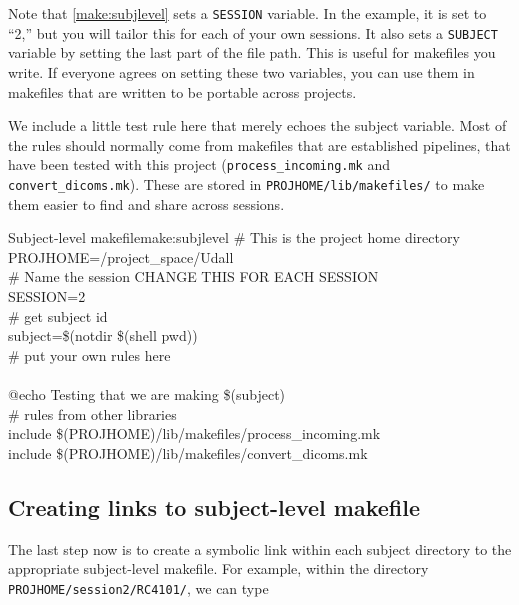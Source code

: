 Note that \autoref{make:subjlevel} sets a \texttt{SESSION} variable. In the example, it is set to ``2,'' but you will tailor this for each of your own sessions. It also sets a \texttt{SUBJECT} variable by setting the last part of the file path. This is useful for makefiles you write. If everyone agrees on setting these two variables, you can use them in makefiles that are written to be portable across projects.

We include a little test rule here that merely echoes the subject variable. Most of the rules should normally come from makefiles that are established pipelines, that have been tested with this project (\texttt{process_incoming.mk} and \texttt{convert_dicoms.mk}). These are stored in \texttt{PROJHOME/lib/makefiles/} to make them easier to find and share across sessions.

\begin{make}{Subject-level makefile}{make:subjlevel}
	\# This is the project home directory \\	
	PROJHOME=/project_space/Udall \\
	
	\# Name the session ­CHANGE THIS FOR EACH SESSION \\	
	SESSION=2 \\
		
	\# get subject id \\
	subject=\$(notdir \$(shell pwd)) \\
	
	\# put your own rules here\\
	
		\\
	\tab @echo Testing that we are making \$(subject) \\
	
	\# rules from other libraries \\	
	include \$(PROJHOME)/lib/makefiles/process_incoming.mk \\	
	include \$(PROJHOME)/lib/makefiles/convert_dicoms.mk
\end{make}

\subsection{Creating links to subject-level makefile}
The last step now is to create a symbolic link within each subject directory to the appropriate subject-level makefile. For example, within the directory \texttt{PROJHOME/session2/RC4101/}, we can type

